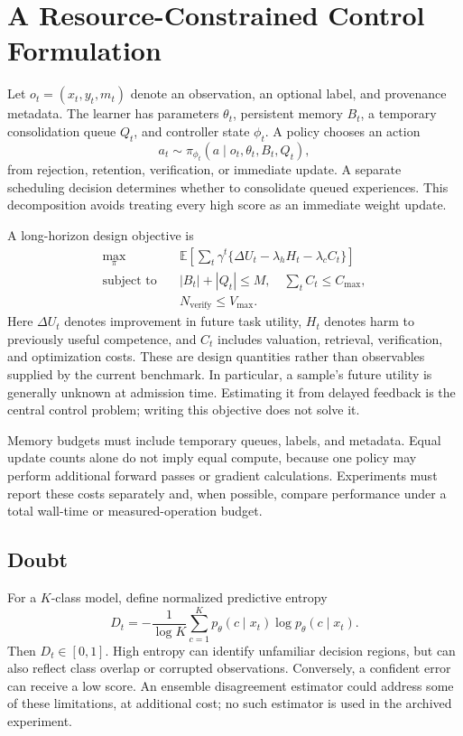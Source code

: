 \documentclass[conference]{IEEEtran}
\newcommand{\E}{\mathbb{E}}
\begin{document}
\section{A Resource-Constrained Control Formulation}
Let $o_t=(x_t,y_t,m_t)$ denote an observation, an optional label, and provenance metadata. The learner has parameters $\theta_t$, persistent memory $B_t$, a temporary consolidation queue $Q_t$, and controller state $\phi_t$. A policy chooses an action
\begin{equation}
 a_t\sim\pi_{\phi_t}(a\mid o_t,\theta_t,B_t,Q_t),
\end{equation}
from rejection, retention, verification, or immediate update. A separate scheduling decision determines whether to consolidate queued experiences. This decomposition avoids treating every high score as an immediate weight update.

A long-horizon design objective is
\begin{align}
\max_{\pi}\quad &\E\!\left[\sum_t\gamma^t\{\Delta U_t-\lambda_h H_t-\lambda_c C_t\}\right] \\
\text{subject to}\quad & |B_t|+|Q_t|\le M,\quad
\sum_t C_t\le C_{\max},\\
&N_{\mathrm{verify}}\le V_{\max}.
\end{align}
Here $\Delta U_t$ denotes improvement in future task utility, $H_t$ denotes harm to previously useful competence, and $C_t$ includes valuation, retrieval, verification, and optimization costs. These are design quantities rather than observables supplied by the current benchmark. In particular, a sample's future utility is generally unknown at admission time. Estimating it from delayed feedback is the central control problem; writing this objective does not solve it.

Memory budgets must include temporary queues, labels, and metadata. Equal update counts alone do not imply equal compute, because one policy may perform additional forward passes or gradient calculations. Experiments must report these costs separately and, when possible, compare performance under a total wall-time or measured-operation budget.

\subsection{Doubt}
For a $K$-class model, define normalized predictive entropy
\begin{equation}
 D_t=-\frac{1}{\log K}\sum_{c=1}^K p_\theta(c\mid x_t)\log p_\theta(c\mid x_t).
\end{equation}
Then $D_t\in[0,1]$. High entropy can identify unfamiliar decision regions, but can also reflect class overlap or corrupted observations. Conversely, a confident error can receive a low score. An ensemble disagreement estimator could address some of these limitations, at additional cost; no such estimator is used in the archived experiment.
\end{document}
